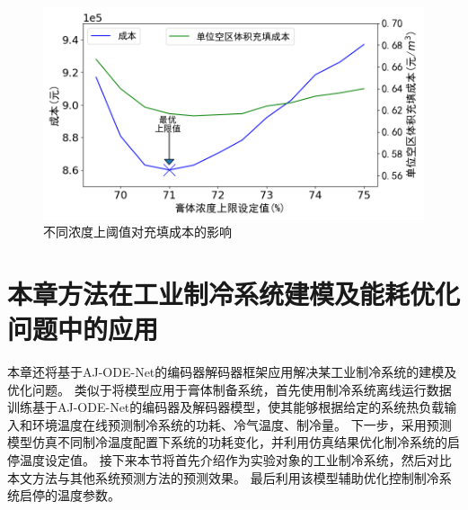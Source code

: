 
\begin{figure}[htb]
    \centering
    \includegraphics[width=0.8\linewidth]{figures/chapter4/cost.png}
    \caption{不同浓度上阈值对充填成本的影响}
    \label{fig:4_paste_concentration}
\end{figure}

\section{本章方法在工业制冷系统建模及能耗优化问题中的应用}
本章还将基于AJ-ODE-Net的编码器解码器框架应用解决某工业制冷系统的建模及优化问题。
类似于将模型应用于膏体制备系统，首先使用制冷系统离线运行数据训练基于AJ-ODE-Net的编码器及解码器模型，使其能够根据给定的系统热负载输入和环境温度在线预测制冷系统的功耗、冷气温度、制冷量。
下一步，采用预测模型仿真不同制冷温度配置下系统的功耗变化，并利用仿真结果优化制冷系统的启停温度设定值。
接下来本节将首先介绍作为实验对象的工业制冷系统，然后对比本文方法与其他系统预测方法的预测效果。
最后利用该模型辅助优化控制制冷系统启停的温度参数。
